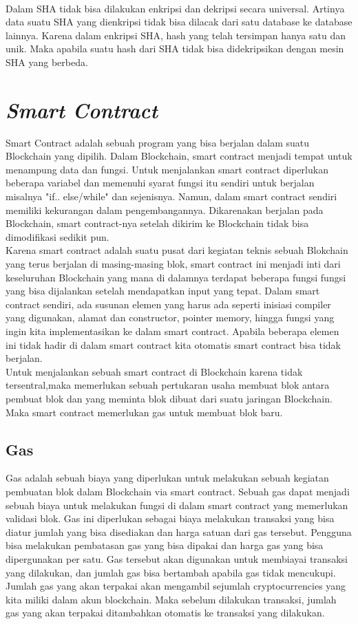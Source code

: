 \\
Dalam SHA tidak bisa dilakukan enkripsi dan dekripsi secara universal. Artinya data suatu SHA yang dienkripsi tidak bisa dilacak dari satu database ke database lainnya. Karena dalam enkripsi SHA, hash yang telah tersimpan hanya satu dan unik. Maka apabila suatu hash dari SHA tidak bisa didekripsikan dengan mesin SHA yang berbeda. 

\section{\emph{Smart Contract}}
\label{sec:smartcontract}

Smart Contract adalah sebuah program yang bisa berjalan dalam suatu Blockchain yang dipilih. Dalam Blockchain, smart contract menjadi tempat untuk menampung data dan fungsi. Untuk menjalankan smart contract diperlukan beberapa variabel dan memenuhi syarat fungsi itu sendiri untuk berjalan misalnya "if.. else/while" dan sejenisnya. Namun, dalam smart contract sendiri memiliki kekurangan dalam pengembangannya. Dikarenakan berjalan pada Blockchain, smart contract-nya setelah dikirim ke Blockchain tidak bisa dimodifikasi sedikit pun.
\\
Karena smart contract adalah suatu pusat dari kegiatan teknis sebuah Blokchain yang terus berjalan di masing-masing blok, smart contract ini menjadi inti dari keseluruhan Blockchain yang mana di dalamnya terdapat beberapa fungsi fungsi yang bisa dijalankan setelah mendapatkan input yang tepat. Dalam smart contract sendiri, ada susunan elemen yang harus ada seperti inisiasi compiler yang digunakan, alamat dan constructor, pointer memory, hingga fungsi yang ingin kita implementasikan ke dalam smart contract. Apabila beberapa elemen ini tidak hadir di dalam smart contract kita otomatis smart contract bisa tidak berjalan.
\\
Untuk menjalankan sebuah smart contract di Blockchain karena tidak tersentral,maka memerlukan sebuah pertukaran usaha membuat blok antara pembuat blok dan yang meminta blok dibuat dari suatu jaringan Blockchain. Maka smart contract memerlukan gas untuk membuat blok baru.

\subsection{Gas}
\label{subsec:gas}

Gas adalah sebuah biaya yang diperlukan untuk melakukan sebuah kegiatan pembuatan blok dalam Blockchain via smart contract. Sebuah gas dapat menjadi sebuah biaya untuk melakukan fungsi di dalam smart contract yang memerlukan validasi blok. Gas ini diperlukan sebagai biaya melakukan transaksi yang bisa diatur jumlah yang bisa disediakan dan harga satuan dari gas tersebut. Pengguna bisa melakukan pembatasan gas yang bisa dipakai dan harga gas yang bisa dipergunakan per satu. Gas tersebut akan digunakan untuk membiayai transaksi yang dilakukan, dan jumlah gas bisa bertambah apabila gas tidak mencukupi. Jumlah gas yang akan terpakai akan mengambil sejumlah cryptocurrencies yang kita miliki dalam akun blockchain. Maka sebelum dilakukan transaksi, jumlah gas yang akan terpakai ditambahkan otomatis ke transaksi yang dilakukan.

